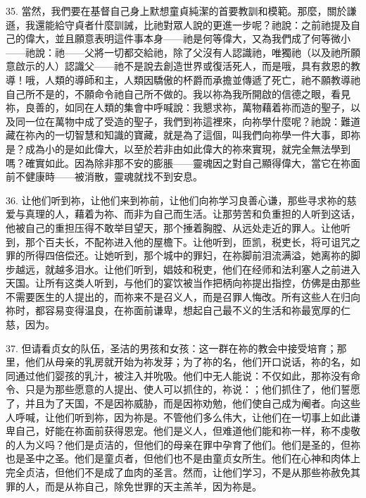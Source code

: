 35. 當然，我們要在基督自己身上默想童貞純潔的首要教訓和模範。那麼，關於謙遜，我還能給守貞者什麼訓誡，比祂對眾人說的更進一步呢？祂說：之前祂提及自己的偉大，並且願意表明這件事本身——祂是何等偉大，又為我們成了何等微小——祂說：祂——父將一切都交給祂，除了父沒有人認識祂，唯獨祂（以及祂所願意啟示的人）認識父——祂不是說去創造世界或復活死人，而是哦，具有救恩的教導！哦，人類的導師和主，人類因驕傲的杯爵而承擔並傳遞了死亡，祂不願教導祂自己所不是的，不願命令祂自己所不做的。我以祢為我所開啟的信德之眼，看見祢，良善的，如同在人類的集會中呼喊說：我懇求祢，萬物藉着祢而造的聖子，以及同一位在萬物中成了受造的聖子，我們到祢這裡來，向祢學什麼呢？祂說：難道藏在祢內的一切智慧和知識的寶藏，就是為了這個，叫我們向祢學一件大事，即祢是？成為小的是如此偉大，以至於若非由如此偉大的祢來實現，就完全無法學到嗎？確實如此。因為除非那不安的膨脹——靈魂因之對自己顯得偉大，當它在祢面前不健康時——被消散，靈魂就找不到安息。\par

36. 让他们听到祢，让他们来到祢前，让他们向祢学习良善心谦，那些寻求祢的慈爱与真理的人，藉着为祢、而非为自己而生活。让那劳苦和负重担的人听到这话，他被自己的重担压得不敢举目望天，那个捶着胸膛、从远处走近的罪人。让他听到，那个百夫长，不配祢进入他的屋檐下。让他听到，匝凯，税吏长，将可诅咒之罪的所得四倍偿还。让她听到，那个城中的罪妇，在祢脚前泪流满溢，她离祢的脚步越远，就越多泪水。让他们听到，娼妓和税吏，他们在经师和法利塞人之前进入天国。让所有这类人听到，与他们的宴饮被当作把柄向祢提出指控，仿佛是由那些不需要医生的人提出的，而祢来不是召义人，而是召罪人悔改。所有这些人在归向祢时，都容易变得温良，在祢面前谦卑，想起自己最不义的生活和祢最宽厚的仁慈，因为。\par

37. 但请看贞女的队伍，圣洁的男孩和女孩：这一群在祢的教会中接受培育；那里，他们从母亲的乳房就开始为祢发芽；为了祢的名，他们开口说话，祢的名，如同通过他们婴孩的乳汁，被注入并吮吸。他们中无人能说：不仅如此，那祢没有命令、只是为那些愿意的人提出、使人可以抓住的，祢说：；他们抓住了，他们誓愿了，并且为了天国，不是因祢威胁，而是因祢劝勉，他们使自己成为阉者。向这些人呼喊，让他们听到祢，因为祢是。不管他们多么伟大，让他们在一切事上如此谦卑自己，好能在祢面前获得恩宠。他们是义人，但难道他们能和祢一样，称不虔敬的人为义吗？他们是贞洁的，但他们的母亲在罪中孕育了他们。他们是圣的，但祢也是圣中之圣。他们是童贞者，但他们也不是由童贞女所生。他们在心神和肉体上完全贞洁，但他们不是成了血肉的圣言。然而，让他们学习，不是从那些祢赦免其罪的人，而是从祢自己，除免世罪的天主羔羊，因为祢是。\par

